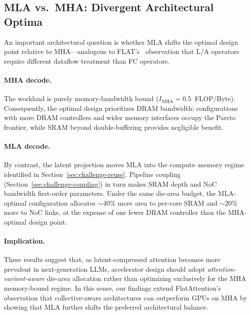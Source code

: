\documentclass[sigconf, review, anonymous]{acmart}
\begin{document}

\subsection{MLA vs.\ MHA: Divergent Architectural Optima}\label{sec:arch-mla-mha}


An important architectural question is whether MLA shifts the optimal
design point relative to MHA---analogous to
FLAT's~\cite{kao2023flat} observation that L/A operators require
different dataflow treatment than FC operators.

\paragraph{MHA decode.}
The workload is purely memory-bandwidth bound ($I_{\text{MHA}} =
0.5$~FLOP/Byte).  Consequently, the optimal design prioritizes DRAM
bandwidth: configurations with more DRAM controllers and wider memory
interfaces occupy the Pareto frontier, while SRAM beyond
double-buffering provides negligible benefit.

\paragraph{MLA decode.}
By contrast, the latent projection moves MLA into the compute--memory
regime identified in Section~\ref{sec:challenge-reuse}.  Pipeline
coupling (Section~\ref{sec:challenge-coupling}) in turn makes SRAM
depth and NoC bandwidth first-order parameters.  Under the same
die-area budget, the MLA-optimal configuration allocates $\sim$40\%
more area to per-core SRAM and $\sim$20\% more to NoC links, at the
expense of one fewer DRAM controller than the MHA-optimal design point.

\paragraph{Implication.}
These results suggest that, as latent-compressed attention becomes more
prevalent in next-generation LLMs, accelerator design should adopt
\emph{attention-variant-aware} die-area allocation rather than
optimizing exclusively for the MHA memory-bound regime.  In this
sense, our findings extend FlatAttention's~\cite{flatattention2024}
observation that collective-aware architectures can outperform GPUs on
MHA by showing that MLA further shifts the preferred architectural
balance.
\end{document}
